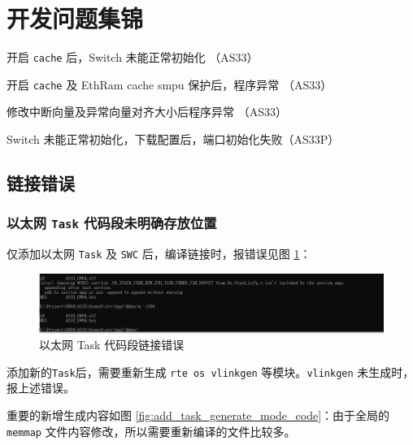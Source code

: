 \section{开发问题集锦}

\begin{introduction}
    \item {}
    \item {}
    \item 开启 \lstinline{cache} 后，Switch 未能正常初始化 （AS33）
    \item 开启 \lstinline{cache} 及 EthRam cache smpu 保护后，程序异常 （AS33）
    \item 修改中断向量及异常向量对齐大小后程序异常 （AS33）
    \item Switch 未能正常初始化，下载配置后，端口初始化失败（AS33P）
\end{introduction}

\subsection{链接错误}
\subsubsection{以太网 \lstinline{Task} 代码段未明确存放位置}\label{subsec:eth_ld_task_error}
仅添加以太网 \lstinline{Task} 及 \lstinline{SWC} 后，编译链接时，报错误见图 \ref{fig:ld_error_eth_task}：

\begin{figure}[htbp]
    \centering
    \includegraphics[scale=0.6]{pic/eth_ld_error_task.png}
    \caption{以太网 Task 代码段链接错误}
    \label{fig:ld_error_eth_task}
\end{figure}

添加新的\lstinline{Task}后，需要重新生成 \lstinline{rte os vlinkgen} 等模块。\lstinline{vlinkgen} 未生成时，报上述错误。

重要的新增生成内容如图 \ref{fig:add_task_generate_mode_code}：由于全局的 \lstinline{memmap} 文件内容修改，所以需要重新编译的文件比较多。

